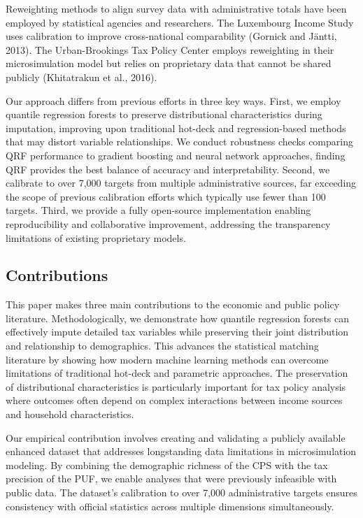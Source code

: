 Reweighting methods to align survey data with administrative totals have been employed by statistical agencies and researchers. The Luxembourg Income Study uses calibration to improve cross-national comparability (Gornick and Jäntti, 2013). The Urban-Brookings Tax Policy Center employs reweighting in their microsimulation model but relies on proprietary data that cannot be shared publicly (Khitatrakun et al., 2016).

Our approach differs from previous efforts in three key ways. First, we employ quantile regression forests to preserve distributional characteristics during imputation, improving upon traditional hot-deck and regression-based methods that may distort variable relationships. We conduct robustness checks comparing QRF performance to gradient boosting and neural network approaches, finding QRF provides the best balance of accuracy and interpretability. Second, we calibrate to over 7,000 targets from multiple administrative sources, far exceeding the scope of previous calibration efforts which typically use fewer than 100 targets. Third, we provide a fully open-source implementation enabling reproducibility and collaborative improvement, addressing the transparency limitations of existing proprietary models.

\subsection{Contributions}

This paper makes three main contributions to the economic and public policy literature. Methodologically, we demonstrate how quantile regression forests can effectively impute detailed tax variables while preserving their joint distribution and relationship to demographics. This advances the statistical matching literature by showing how modern machine learning methods can overcome limitations of traditional hot-deck and parametric approaches. The preservation of distributional characteristics is particularly important for tax policy analysis where outcomes often depend on complex interactions between income sources and household characteristics.

Our empirical contribution involves creating and validating a publicly available enhanced dataset that addresses longstanding data limitations in microsimulation modeling. By combining the demographic richness of the CPS with the tax precision of the PUF, we enable analyses that were previously infeasible with public data. The dataset's calibration to over 7,000 administrative targets ensures consistency with official statistics across multiple dimensions simultaneously.

